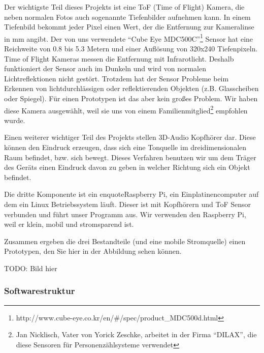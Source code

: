 \documentclass[a4paper,12pt,ngerman]{scrartcl}
\begin{document}
Der wichtigste Teil dieses Projekts ist eine ToF (Time of Flight) Kamera, die neben normalen Fotos 
auch sogenannte Tiefenbilder aufnehmen kann.
In einem Tiefenbild bekommt jeder Pixel einen Wert, der die Entfernung zur Kameralinse in mm angibt.
Der von uns verwendete \enquote{Cube Eye MDC500C}\footnote{http://www.cube-eye.co.kr/en/\#/spec/product\_MDC500d.html}
Sensor hat eine Reichweite von 0.8 bis 5.3 Metern und einer Auflösung von 320x240 Tiefenpixeln. 
Time of Flight Kameras messen die Entfernung mit Infrarotlicht. Deshalb funktioniert der Sensor auch 
im Dunkeln und wird von normalen Lichtreflektionen nicht gestört. Trotzdem hat der Sensor Probleme beim
Erkennen von lichtdurchlässigen oder reflektierenden Objekten (z.B. Glasscheiben oder Spiegel). Für einen
Prototypen ist das aber kein großes Problem. Wir haben diese Kamera ausgewählt, weil sie uns von einem 
Familienmitglied\footnote{Jan Nicklisch, Vater von Yorick Zeschke, arbeitet in der Firma
	\enquote{DILAX}, die diese Sensoren für Personenzählsysteme verwendet} 
empfohlen wurde.\par
Einen weiterer wichtiger Teil des Projekts stellen 3D-Audio Kopfhörer dar. Diese können den Eindruck
erzeugen, dass sich eine Tonquelle im dreidimensionalen
Raum befindet, bzw. sich bewegt. Dieses Verfahren benutzen wir um dem Träger des Geräts einen Eindruck
davon zu geben in welcher Richtung sich ein Objekt befindet.\par 
Die dritte Komponente ist ein enquote{Raspberry Pi}, ein 
Einplatinencomputer auf dem ein Linux Betriebssystem läuft. Dieser ist mit Kopfhörern und ToF Sensor 
verbunden und führt unser Programm aus. Wir verwenden den Raspberry Pi, weil er klein, mobil und 
stromsparend ist.\par 
Zusammen ergeben die drei Bestandteile (und eine mobile Stromquelle) einen Prototypen, den Sie hier 
in der Abbildung sehen können.
\par 
TODO: Bild hier 

\subsubsection{Softwarestruktur}
\end{document}

